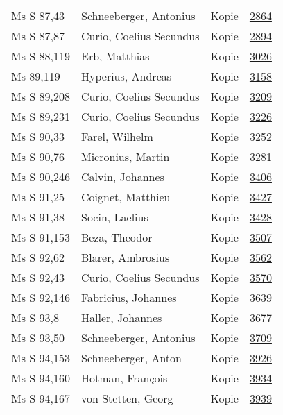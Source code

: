 \documentclass[10pt,a4paper,landscape]{report}
\begin{document}
\begin{longtable}{p{16cm}p{4cm}lr}
Ms S 87,43	&	Schneeberger, Antonius	&	Kopie	&	\href{http://130.60.24.72/assignment/2864}{2864}\\
Ms S 87,87	&	Curio, Coelius Secundus	&	Kopie	&	\href{http://130.60.24.72/assignment/2894}{2894}\\
Ms S 88,119	&	Erb, Matthias	&	Kopie	&	\href{http://130.60.24.72/assignment/3026}{3026}\\
Ms 89,119	&	Hyperius, Andreas	&	Kopie	&	\href{http://130.60.24.72/assignment/3158}{3158}\\
Ms S 89,208	&	Curio, Coelius Secundus	&	Kopie	&	\href{http://130.60.24.72/assignment/3209}{3209}\\
Ms S 89,231	&	Curio, Coelius Secundus	&	Kopie	&	\href{http://130.60.24.72/assignment/3226}{3226}\\
Ms S 90,33	&	Farel, Wilhelm	&	Kopie	&	\href{http://130.60.24.72/assignment/3252}{3252}\\
Ms S 90,76	&	Micronius, Martin	&	Kopie	&	\href{http://130.60.24.72/assignment/3281}{3281}\\
Ms S 90,246	&	Calvin, Johannes	&	Kopie	&	\href{http://130.60.24.72/assignment/3406}{3406}\\
Ms S 91,25	&	Coignet, Matthieu	&	Kopie	&	\href{http://130.60.24.72/assignment/3427}{3427}\\
Ms S 91,38	&	Socin, Laelius	&	Kopie	&	\href{http://130.60.24.72/assignment/3428}{3428}\\
Ms S 91,153	&	Beza, Theodor	&	Kopie	&	\href{http://130.60.24.72/assignment/3507}{3507}\\
Ms S 92,62	&	Blarer, Ambrosius	&	Kopie	&	\href{http://130.60.24.72/assignment/3562}{3562}\\
Ms S 92,43	&	Curio, Coelius Secundus	&	Kopie	&	\href{http://130.60.24.72/assignment/3570}{3570}\\
Ms S 92,146	&	Fabricius, Johannes	&	Kopie	&	\href{http://130.60.24.72/assignment/3639}{3639}\\
Ms S 93,8	&	Haller, Johannes	&	Kopie	&	\href{http://130.60.24.72/assignment/3677}{3677}\\
Ms S 93,50	&	Schneeberger, Antonius	&	Kopie	&	\href{http://130.60.24.72/assignment/3709}{3709}\\
Ms S 94,153	&	Schneeberger, Anton	&	Kopie	&	\href{http://130.60.24.72/assignment/3926}{3926}\\
Ms S 94,160	&	Hotman, François	&	Kopie	&	\href{http://130.60.24.72/assignment/3934}{3934}\\
Ms S 94,167	&	von Stetten, Georg	&	Kopie	&	\href{http://130.60.24.72/assignment/3939}{3939}\\

\end{longtable}
\end{document}
